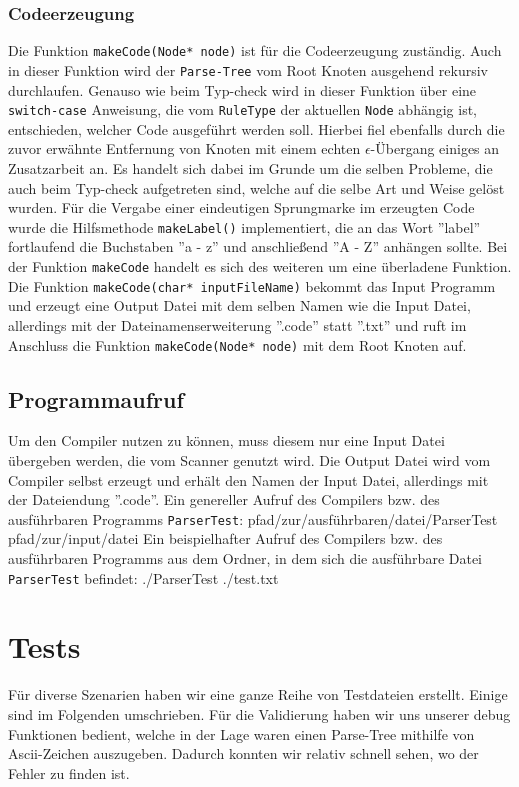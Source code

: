 \documentclass[
a4paper,   %
11pt,      %
oneside,   %
onecolumn, %
final      %
]{article}
\newcommand{\code}[1]{\lstinline$#1$}
\begin{document}
\subsubsection{Codeerzeugung}
Die Funktion \code{makeCode(Node* node)} ist für die Codeerzeugung zuständig. Auch in dieser Funktion wird der \code{Parse-Tree} vom Root Knoten ausgehend rekursiv durchlaufen. Genauso wie beim Typ-check wird in dieser Funktion über eine \code{switch-case} Anweisung, die vom \code{RuleType} der aktuellen \code{Node} abhängig ist, entschieden, welcher Code ausgeführt werden soll. Hierbei fiel ebenfalls durch die zuvor erwähnte Entfernung von Knoten mit einem echten $\epsilon$-Übergang einiges an Zusatzarbeit an. Es handelt sich dabei im Grunde um die selben Probleme, die auch beim Typ-check aufgetreten sind, welche auf die selbe Art und Weise gelöst wurden. Für die Vergabe einer eindeutigen Sprungmarke im erzeugten Code wurde die Hilfsmethode \code{makeLabel()} implementiert, die an das Wort ''label'' fortlaufend die Buchstaben ''a - z'' und anschließend ''A - Z'' anhängen sollte. Bei der Funktion \code{makeCode} handelt es sich des weiteren um eine überladene Funktion. Die Funktion \code{makeCode(char* inputFileName)} bekommt das Input Programm und erzeugt eine Output Datei mit dem selben Namen wie die Input Datei, allerdings mit der Dateinamenserweiterung ''.code'' statt ''.txt'' und ruft im Anschluss die Funktion \code{makeCode(Node* node)} mit dem Root Knoten auf.

\subsection{Programmaufruf}
Um den Compiler nutzen zu können, muss diesem nur eine Input Datei übergeben werden, die vom Scanner genutzt wird. Die Output Datei wird vom Compiler selbst erzeugt und erhält den Namen der Input Datei, allerdings mit der Dateiendung ''.code''. Ein genereller Aufruf des Compilers bzw. des ausführbaren Programms \code{ParserTest}:
\newline
pfad/zur/ausführbaren/datei/ParserTest pfad/zur/input/datei
\newline
Ein beispielhafter Aufruf des Compilers bzw. des ausführbaren Programms aus dem Ordner, in dem sich die ausführbare Datei \code{ParserTest} befindet:
\newline
./ParserTest ./test.txt

\section{Tests}
Für diverse Szenarien haben wir eine ganze Reihe von Testdateien erstellt. Einige sind im Folgenden umschrieben. Für die Validierung haben wir uns unserer debug Funktionen bedient, welche in der Lage waren einen Parse-Tree mithilfe von Ascii-Zeichen auszugeben. Dadurch konnten wir relativ schnell sehen, wo der Fehler zu finden ist.
\end{document}
